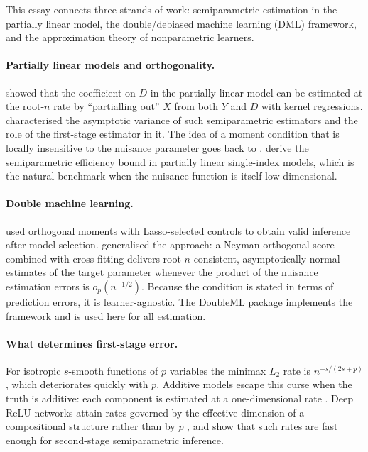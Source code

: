 \documentclass[11pt,a4paper]{article}
\begin{document}
This essay connects three strands of work: semiparametric estimation in the partially linear model, the double/debiased machine learning (DML) framework, and the approximation theory of nonparametric learners.

\paragraph{Partially linear models and orthogonality.} \citet{robinson1988} showed that the coefficient on $D$ in the partially linear model can be estimated at the root-$n$ rate by ``partialling out'' $X$ from both $Y$ and $D$ with kernel regressions. \citet{newey1994} characterised the asymptotic variance of such semiparametric estimators and the role of the first-stage estimator in it. The idea of a moment condition that is locally insensitive to the nuisance parameter goes back to \citet{neyman1959}. \citet{chen2014} derive the semiparametric efficiency bound in partially linear single-index models, which is the natural benchmark when the nuisance function is itself low-dimensional.

\paragraph{Double machine learning.} \citet{belloni2014} used orthogonal moments with Lasso-selected controls to obtain valid inference after model selection. \citet{chernozhukov2018} generalised the approach: a Neyman-orthogonal score combined with cross-fitting delivers root-$n$ consistent, asymptotically normal estimates of the target parameter whenever the product of the nuisance estimation errors is $o_p(n^{-1/2})$. Because the condition is stated in terms of prediction errors, it is learner-agnostic. The DoubleML package \citep{bach2022,bach2024} implements the framework and is used here for all estimation.

\paragraph{What determines first-stage error.} For isotropic $s$-smooth functions of $p$ variables the minimax $L_2$ rate is $n^{-s/(2s+p)}$ \citep{stone1982}, which deteriorates quickly with $p$. Additive models escape this curse when the truth is additive: each component is estimated at a one-dimensional rate \citep{stone1985,hastie1990}. Deep ReLU networks attain rates governed by the effective dimension of a compositional structure rather than by $p$ \citep{schmidthieber2020}, and \citet{farrell2021} show that such rates are fast enough for second-stage semiparametric inference.
\end{document}

